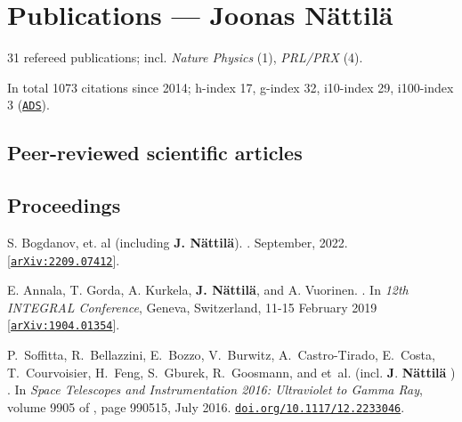 \documentclass[10pt]{article}
\begin{document}
\section*{Publications --- Joonas N\"attil\"a}
31 refereed publications; 
incl. 
\textit{Nature Physics} (1), 
\textit{PRL/PRX} (4).

\noindent
In total 1073 citations since 2014; h-index 17, g-index 32, i10-index 29, i100-index 3 (\href{http://adsabs.harvard.edu/cgi-bin/abs_connect?author=nattila,+J.&aut_syn=YES&return_req=no_params}{\nolinkurl{ADS}}).

\subsection*{\phantom{sub} Peer-reviewed scientific articles}

\vspace{-20pt}
\renewcommand\refname{\phantom{bla}}



\nocite{*}

\subsection*{\phantom{sub} Proceedings}
\vspace{-20pt}
\begin{thebibliography}{1}
\vspace{-5pt}


S. Bogdanov, et. al (including \textbf{J. N\"attil\"a}).
.
\newblock September, 2022.
[\href{https://arxiv.org/abs/2209.07412}{\nolinkurl{arXiv:2209.07412}}].

E. {Annala}, T. {Gorda}, A. {Kurkela}, \textbf{J. {N{\"a}ttil{\"a}}}, and A. {Vuorinen}.
.
\newblock In {\em 12th INTEGRAL Conference}, Geneva, Switzerland, 11-15 February 2019
[\href{https://arxiv.org/abs/1904.01354}{\nolinkurl{arXiv:1904.01354}}].

P.~{Soffitta}, R.~{Bellazzini}, E.~{Bozzo}, V.~{Burwitz}, A.~{Castro-Tirado},
  E.~{Costa}, T.~{Courvoisier}, H.~{Feng}, S.~{Gburek}, R.~{Goosmann}, and
  et~al. (incl. \textbf{J}. \textbf{{N{\"a}ttil{\"a}}} )
.
\newblock In {\em Space Telescopes and Instrumentation 2016: Ultraviolet to
  Gamma Ray}, volume 9905 of {\em \procspie}, page 990515, July 2016.
\href{https://doi.org/10.1117/12.2233046}{\nolinkurl{doi.org/10.1117/12.2233046}}.

\end{thebibliography}
\end{document}
